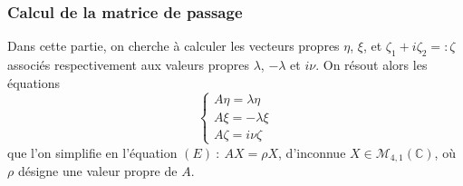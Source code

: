\documentclass[12pt]{article}
\begin{document}
	
	\subsubsection{Calcul de la matrice de passage}
	Dans cette partie, on cherche à calculer les vecteurs propres $\eta$, $\xi$, et $\zeta_1 + i\zeta_2 =: \zeta$ associés respectivement aux valeurs propres $\lambda$, $-\lambda$ et $i\nu$.
	On résout alors les équations
	\begin{equation}
		\label{eq aux vps}
		\begin{cases}
			A\eta = \lambda \eta
			\\
			A\xi = -\lambda \xi
			\\
			A\zeta = i\nu \zeta
		\end{cases}
	\end{equation}
	que l'on simplifie en l'équation $(E) \ : \ AX = \rho X$, d'inconnue $X \in \mathcal{M}_{4,1}(\mathbb{C})$, où $\rho$ désigne une valeur propre de $A$.
	
\end{document}
